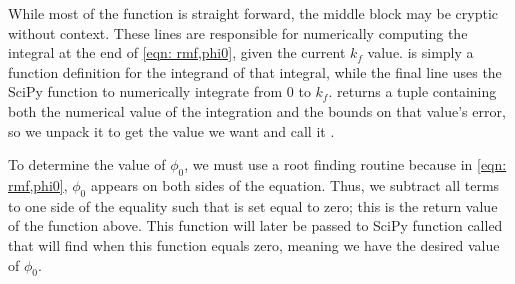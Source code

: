 While most of the function is straight forward, the middle block may be cryptic without context. These lines are responsible for numerically computing the integral at the end of \eqref{eqn: rmf,phi0}, given the current $k_f$ value.  is simply a function definition for the integrand of that integral, while the final line uses the SciPy function  to numerically integrate  from $0$ to $k_f$.  returns a tuple containing both the numerical value of the integration and the bounds on that value's error, so we unpack it to get the value we want and call it . 

To determine the value of $\phi_0$, we must use a root finding routine because in \eqref{eqn: rmf,phi0}, $\phi_0$ appears on both sides of the equation. Thus, we subtract all terms to one side of the equality such that is set equal to zero; this is the return value of the  function above. This function will later be passed to SciPy function called  that will find when this function equals zero, meaning we have the desired value of $\phi_0$.

